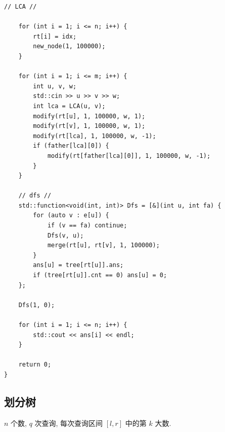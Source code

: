 \documentclass[UTF8, a4paper, titlepage, twoside]{ctexart}
\begin{document}
\begin{lstlisting}[style=cpp]
    // LCA //

    for (int i = 1; i <= n; i++) {
        rt[i] = idx;
        new_node(1, 100000);
    }

    for (int i = 1; i <= m; i++) {
        int u, v, w;
        std::cin >> u >> v >> w;
        int lca = LCA(u, v);
        modify(rt[u], 1, 100000, w, 1);
        modify(rt[v], 1, 100000, w, 1);
        modify(rt[lca], 1, 100000, w, -1);
        if (father[lca][0]) {
            modify(rt[father[lca][0]], 1, 100000, w, -1);
        }
    }

    // dfs //
    std::function<void(int, int)> Dfs = [&](int u, int fa) {
        for (auto v : e[u]) {
            if (v == fa) continue;
            Dfs(v, u);
            merge(rt[u], rt[v], 1, 100000);
        }
        ans[u] = tree[rt[u]].ans;
        if (tree[rt[u]].cnt == 0) ans[u] = 0;
    };

    Dfs(1, 0);

    for (int i = 1; i <= n; i++) {
        std::cout << ans[i] << endl;
    }

    return 0;
}	
\end{lstlisting}


\subsection{ 划分树 }

$n$ 个数, $q$ 次查询, 每次查询区间 $[l, r]$ 中的第 $k$ 大数.  
\end{document}
